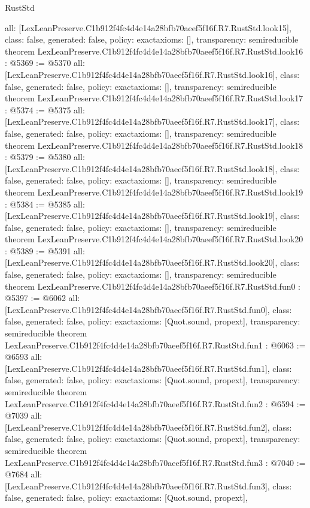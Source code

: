 \begin{lexlean}{RustStd}
\begin{coremodule}
{  all: [LexLeanPreserve.C1b912f4fc4d4e14a28bfb70aeef5f16f.R7.RustStd.look15],
  class: false,
  generated: false,
  policy: exact{axioms: []},
  transparency: semireducible
}
theorem LexLeanPreserve.C1b912f4fc4d4e14a28bfb70aeef5f16f.R7.RustStd.look16 : @5369 := @5370 {
  all: [LexLeanPreserve.C1b912f4fc4d4e14a28bfb70aeef5f16f.R7.RustStd.look16],
  class: false,
  generated: false,
  policy: exact{axioms: []},
  transparency: semireducible
}
theorem LexLeanPreserve.C1b912f4fc4d4e14a28bfb70aeef5f16f.R7.RustStd.look17 : @5374 := @5375 {
  all: [LexLeanPreserve.C1b912f4fc4d4e14a28bfb70aeef5f16f.R7.RustStd.look17],
  class: false,
  generated: false,
  policy: exact{axioms: []},
  transparency: semireducible
}
theorem LexLeanPreserve.C1b912f4fc4d4e14a28bfb70aeef5f16f.R7.RustStd.look18 : @5379 := @5380 {
  all: [LexLeanPreserve.C1b912f4fc4d4e14a28bfb70aeef5f16f.R7.RustStd.look18],
  class: false,
  generated: false,
  policy: exact{axioms: []},
  transparency: semireducible
}
theorem LexLeanPreserve.C1b912f4fc4d4e14a28bfb70aeef5f16f.R7.RustStd.look19 : @5384 := @5385 {
  all: [LexLeanPreserve.C1b912f4fc4d4e14a28bfb70aeef5f16f.R7.RustStd.look19],
  class: false,
  generated: false,
  policy: exact{axioms: []},
  transparency: semireducible
}
theorem LexLeanPreserve.C1b912f4fc4d4e14a28bfb70aeef5f16f.R7.RustStd.look20 : @5389 := @5391 {
  all: [LexLeanPreserve.C1b912f4fc4d4e14a28bfb70aeef5f16f.R7.RustStd.look20],
  class: false,
  generated: false,
  policy: exact{axioms: []},
  transparency: semireducible
}
theorem LexLeanPreserve.C1b912f4fc4d4e14a28bfb70aeef5f16f.R7.RustStd.fun0 : @5397 := @6062 {
  all: [LexLeanPreserve.C1b912f4fc4d4e14a28bfb70aeef5f16f.R7.RustStd.fun0],
  class: false,
  generated: false,
  policy: exact{axioms: [Quot.sound, propext]},
  transparency: semireducible
}
theorem LexLeanPreserve.C1b912f4fc4d4e14a28bfb70aeef5f16f.R7.RustStd.fun1 : @6063 := @6593 {
  all: [LexLeanPreserve.C1b912f4fc4d4e14a28bfb70aeef5f16f.R7.RustStd.fun1],
  class: false,
  generated: false,
  policy: exact{axioms: [Quot.sound, propext]},
  transparency: semireducible
}
theorem LexLeanPreserve.C1b912f4fc4d4e14a28bfb70aeef5f16f.R7.RustStd.fun2 : @6594 := @7039 {
  all: [LexLeanPreserve.C1b912f4fc4d4e14a28bfb70aeef5f16f.R7.RustStd.fun2],
  class: false,
  generated: false,
  policy: exact{axioms: [Quot.sound, propext]},
  transparency: semireducible
}
theorem LexLeanPreserve.C1b912f4fc4d4e14a28bfb70aeef5f16f.R7.RustStd.fun3 : @7040 := @7684 {
  all: [LexLeanPreserve.C1b912f4fc4d4e14a28bfb70aeef5f16f.R7.RustStd.fun3],
  class: false,
  generated: false,
  policy: exact{axioms: [Quot.sound, propext]},
}
\end{coremodule}
\end{lexlean}
